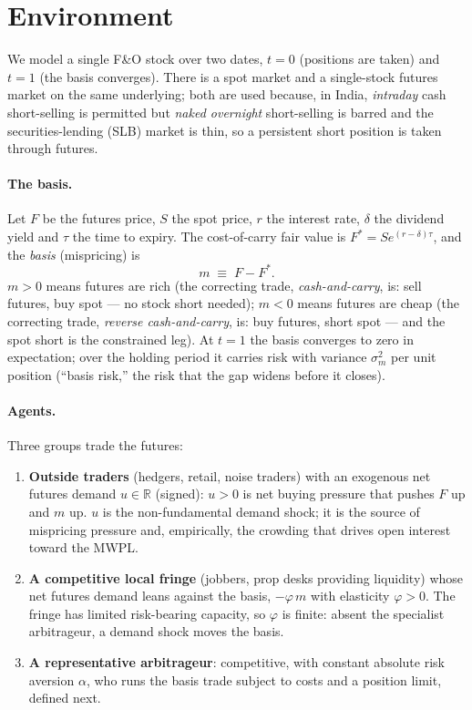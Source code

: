 \documentclass[11pt,a4paper]{article}
\newcommand{\R}{\mathbb{R}}\newcommand{\dd}{\mathrm{d}}\newcommand{\1}{\mathbf{1}}
\theoremstyle{plain}
\theoremstyle{definition}
\theoremstyle{remark}
\begin{document}
\section{Environment}\label{sec:env}
We model a single F\&O stock over two dates, $t=0$ (positions are taken) and $t=1$ (the basis converges). There is a spot market and a single-stock futures market on the same underlying; both are used because, in India, \emph{intraday} cash short-selling is permitted but \emph{naked overnight} short-selling is barred and the securities-lending (SLB) market is thin, so a persistent short position is taken through futures.

\paragraph{The basis.} Let $F$ be the futures price, $S$ the spot price, $r$ the interest rate, $\delta$ the dividend yield and $\tau$ the time to expiry. The cost-of-carry fair value is $F^\ast = S e^{(r-\delta)\tau}$, and the \emph{basis} (mispricing) is
\begin{equation}
m \;\equiv\; F - F^\ast .
\end{equation}
$m>0$ means futures are rich (the correcting trade, \emph{cash-and-carry}, is: sell futures, buy spot --- no stock short needed); $m<0$ means futures are cheap (the correcting trade, \emph{reverse cash-and-carry}, is: buy futures, short spot --- and the spot short is the constrained leg). At $t=1$ the basis converges to zero in expectation; over the holding period it carries risk with variance $\sigma_m^2$ per unit position (``basis risk,'' the risk that the gap widens before it closes).

\paragraph{Agents.} Three groups trade the futures:
\begin{enumerate}[leftmargin=1.5em,itemsep=1pt]
\item \textbf{Outside traders} (hedgers, retail, noise traders) with an exogenous net futures demand $u\in\R$ (signed): $u>0$ is net buying pressure that pushes $F$ up and $m$ up. $u$ is the non-fundamental demand shock; it is the source of mispricing pressure and, empirically, the crowding that drives open interest toward the MWPL.
\item \textbf{A competitive local fringe} (jobbers, prop desks providing liquidity) whose net futures demand leans against the basis, $-\varphi\, m$ with elasticity $\varphi>0$. The fringe has limited risk-bearing capacity, so $\varphi$ is finite: absent the specialist arbitrageur, a demand shock moves the basis.
\item \textbf{A representative arbitrageur}: competitive, with constant absolute risk aversion $\alpha$, who runs the basis trade subject to costs and a position limit, defined next.
\end{enumerate}
\end{document}
